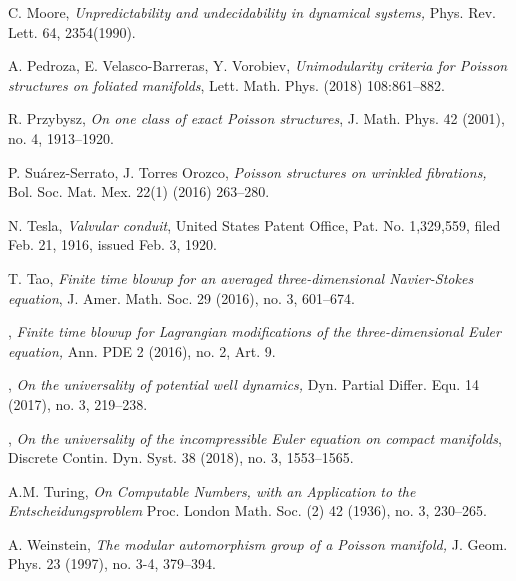 \documentclass{amsart}
\begin{document}
\begin{thebibliography}{}
 C. Moore, {\it  Unpredictability and undecidability in dynamical systems,} Phys. Rev. Lett. 64, 2354(1990).

 A. Pedroza, E. Velasco-Barreras, Y. Vorobiev, {\it Unimodularity criteria for Poisson structures on foliated manifolds}, Lett. Math. Phys. (2018) 108:861--882.

 R. Przybysz,  {\it On one class of exact Poisson structures}, J. Math. Phys. 42 (2001), no. 4, 1913--1920.

 P. Su\'arez-Serrato, J. Torres Orozco, {\it Poisson structures on wrinkled fibrations,} Bol. Soc. Mat. Mex.  22(1) (2016) 263--280.

 N. Tesla, {\it Valvular conduit}, United States Patent Office, Pat. No. 1,329,559, filed Feb. 21, 1916, issued Feb. 3, 1920.

 T. Tao, {\it Finite time blowup for an averaged three-dimensional Navier-Stokes equation},  J. Amer. Math. Soc. 29 (2016), no. 3, 601--674.

 \bysame , {\it  Finite time blowup for Lagrangian modifications of the three-dimensional Euler equation,} Ann. PDE 2 (2016), no. 2, Art. 9.

 \bysame , {\it On the universality of potential well dynamics,}
Dyn. Partial Differ. Equ. 14 (2017), no. 3, 219--238.

 \bysame , {\it On the universality of the incompressible Euler equation on compact manifolds}, Discrete Contin. Dyn. Syst. 38 (2018), no. 3, 1553--1565.

  A.M. Turing,  {\it On Computable Numbers, with an Application to the Entscheidungsproblem}
Proc. London Math. Soc. (2) 42 (1936), no. 3, 230--265.

 A. Weinstein, {\it The modular automorphism group of a Poisson manifold,} J. Geom. Phys. 23 (1997), no. 3-4, 379--394.

\end{thebibliography}
\end{document}
